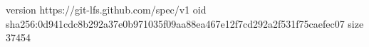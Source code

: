 version https://git-lfs.github.com/spec/v1
oid sha256:0d941cdc8b292a37e0b971035f09aa88ea467e12f7cd292a2f531f75caefec07
size 37454
